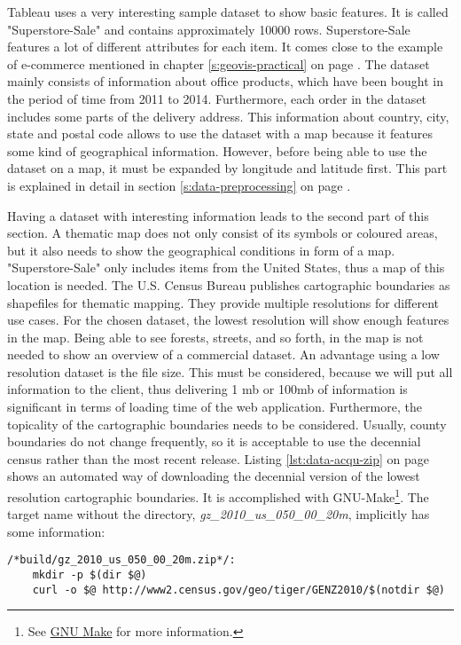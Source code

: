 Tableau uses a very interesting sample dataset to show basic features. It is called "Superstore-Sale" and contains approximately 10000 rows. Superstore-Sale features a lot of different attributes for each item. It comes close to the example of e-commerce mentioned in chapter \ref{s:geovis-practical} on page \pageref{s:geovis-practical}. The dataset mainly consists of information about office products, which have been bought in the period of time from 2011 to 2014. Furthermore, each order in the dataset includes some parts of the delivery address. This information about country, city, state and postal code allows to use the dataset with a map because it features some kind of geographical information. However, before being able to use the dataset on a map, it must be expanded by longitude and latitude first. This part is explained in detail in section \ref{s:data-preprocessing} on page \pageref{s:data-preprocessing}.

Having a dataset with interesting information leads to the second part of this section. A thematic map does not only consist of its symbols or coloured areas, but it also needs to show the geographical conditions in form of a map. "Superstore-Sale" only includes items from the United States, thus a map of this location is needed. The U.S. Census Bureau publishes cartographic boundaries as shapefiles for thematic mapping. They provide multiple resolutions for different use cases. For the chosen dataset, the lowest resolution will show enough features in the map. Being able to see forests, streets, and so forth, in the map is not needed to show an overview of a commercial dataset. An advantage using a low resolution dataset is the file size. This must be considered, because we will put all information to the client, thus delivering 1 \ac{mb} or 100\ac{mb} of information is significant in terms of loading time of the web application.
Furthermore, the topicality of the cartographic boundaries needs to be considered. Usually, county boundaries do not change frequently, so it is acceptable to use the decennial census rather than the most recent release. Listing \ref{lst:data-acqu-zip} on page \pageref{lst:data-acqu-zip} shows an automated way of downloading the decennial version of the lowest resolution cartographic boundaries. It is accomplished with GNU-Make\footnote{See \href{https://www.gnu.org/software/make/}{GNU Make} for more information.}. The target name without the directory, \textit{gz\_2010\_us\_050\_00\_20m}, implicitly has some information:

\begin{lstlisting}[style={makefile}, caption={Make task for downloading cartographic boundaries}, label={lst:data-acqu-zip}]
/*build/gz_2010_us_050_00_20m.zip*/:
    mkdir -p $(dir $@)
    curl -o $@ http://www2.census.gov/geo/tiger/GENZ2010/$(notdir $@)
\end{lstlisting}

